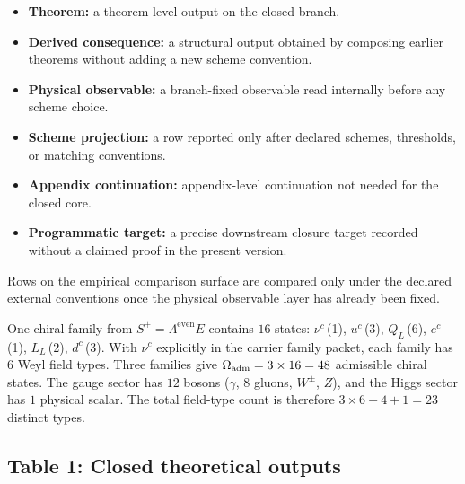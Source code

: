 \begin{tcolorbox}[colback=tfptblue!2, colframe=tfptblue!50, breakable,
    title={Status legend for the particle ledger}, colbacktitle=tfptblue!70]
\begin{itemize}[leftmargin=1.5em, topsep=3pt, itemsep=2pt]
\item \textbf{Theorem:} a theorem-level output on the closed branch.
\item \textbf{Derived consequence:} a structural output obtained by composing earlier theorems without adding a new scheme convention.
\item \textbf{Physical observable:} a branch-fixed observable read internally before any scheme choice.
\item \textbf{Scheme projection:} a row reported only after declared schemes, thresholds, or matching conventions.
\item \textbf{Appendix continuation:} appendix-level continuation not needed for the closed core.
\item \textbf{Programmatic target:} a precise downstream closure target recorded without a claimed proof in the present version.
\end{itemize}
Rows on the empirical comparison surface are compared only under the declared external
conventions once the physical observable layer has already been fixed.
\end{tcolorbox}

\begin{remark}
\label{rem:counting-convention}
One chiral family from $S^+=\Lambda^{\mathrm{even}}E$ contains $16$ states:
$\nu^c$\,(1), $u^c$\,(3), $Q_L$\,(6), $e^c$\,(1), $L_L$\,(2), $d^c$\,(3).
With $\nu^c$ explicitly in the carrier family packet, each family has $6$ Weyl field types.
Three families give $\Omega_{\mathrm{adm}}=3\times 16=48$ admissible chiral states.
The gauge sector has $12$ bosons ($\gamma$, $8$ gluons, $W^\pm$, $Z$), and the Higgs sector has
$1$ physical scalar. The total field-type count is therefore $3\times 6+4+1=23$ distinct types.
\end{remark}

\subsection{Table 1: Closed theoretical outputs}

